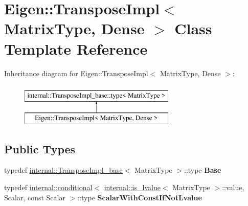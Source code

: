 \hypertarget{class_eigen_1_1_transpose_impl_3_01_matrix_type_00_01_dense_01_4}{}\section{Eigen\+::Transpose\+Impl$<$ Matrix\+Type, Dense $>$ Class Template Reference}
\label{class_eigen_1_1_transpose_impl_3_01_matrix_type_00_01_dense_01_4}
Inheritance diagram for Eigen\+::Transpose\+Impl$<$ Matrix\+Type, Dense $>$\+:\begin{figure}[H]
\begin{center}
\leavevmode
\includegraphics[height=2.000000cm]{class_eigen_1_1_transpose_impl_3_01_matrix_type_00_01_dense_01_4}
\end{center}
\end{figure}
\subsection*{Public Types}
\begin{DoxyCompactItemize}
\item 
\mbox{\label{class_eigen_1_1_transpose_impl_3_01_matrix_type_00_01_dense_01_4_adca85c1badef95fe3dffea3abd200920}} 
typedef \mbox{\hyperlink{struct_eigen_1_1internal_1_1_transpose_impl__base}{internal\+::\+Transpose\+Impl\+\_\+base}}$<$ Matrix\+Type $>$\+::type {\bfseries Base}
\item 
\mbox{\label{class_eigen_1_1_transpose_impl_3_01_matrix_type_00_01_dense_01_4_a8db358fcda2f858bc1bda7cfafe5b172}} 
typedef \mbox{\hyperlink{struct_eigen_1_1internal_1_1conditional}{internal\+::conditional}}$<$ \mbox{\hyperlink{struct_eigen_1_1internal_1_1is__lvalue}{internal\+::is\+\_\+lvalue}}$<$ Matrix\+Type $>$\+::value, Scalar, const Scalar $>$\+::type {\bfseries Scalar\+With\+Const\+If\+Not\+Lvalue}
\end{DoxyCompactItemize}
